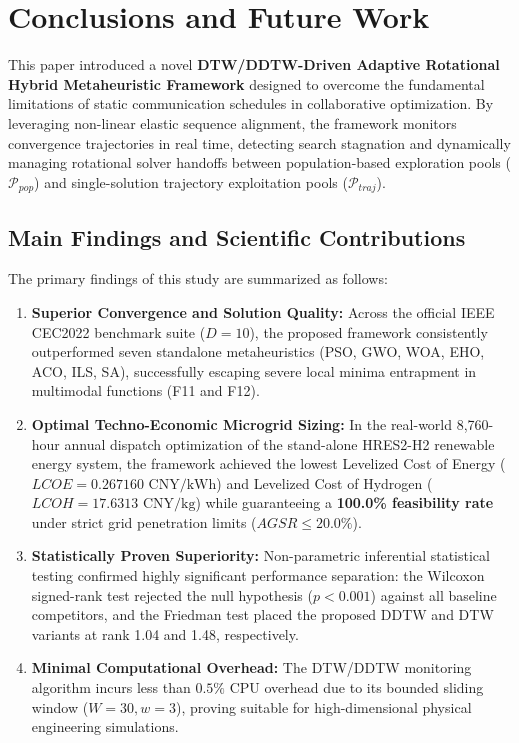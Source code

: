 \section{Conclusions and Future Work}
\label{sec:conclusions}

This paper introduced a novel \textbf{DTW/DDTW-Driven Adaptive Rotational Hybrid Metaheuristic Framework} designed to overcome the fundamental limitations of static communication schedules in collaborative optimization. By leveraging non-linear elastic sequence alignment, the framework monitors convergence trajectories in real time, detecting search stagnation and dynamically managing rotational solver handoffs between population-based exploration pools ($\mathcal{P}_{pop}$) and single-solution trajectory exploitation pools ($\mathcal{P}_{traj}$).

\subsection{Main Findings and Scientific Contributions}
\label{sec:conclusions_findings}

The primary findings of this study are summarized as follows:
\begin{enumerate}
    \item \textbf{Superior Convergence and Solution Quality:} Across the official IEEE CEC2022 benchmark suite ($D=10$), the proposed framework consistently outperformed seven standalone metaheuristics (PSO, GWO, WOA, EHO, ACO, ILS, SA), successfully escaping severe local minima entrapment in multimodal functions (F11 and F12).
    \item \textbf{Optimal Techno-Economic Microgrid Sizing:} In the real-world 8,760-hour annual dispatch optimization of the stand-alone HRES2-H2 renewable energy system, the framework achieved the lowest Levelized Cost of Energy ($LCOE = 0.267160 \text{ CNY/kWh}$) and Levelized Cost of Hydrogen ($LCOH = 17.6313 \text{ CNY/kg}$) while guaranteeing a \textbf{100.0\% feasibility rate} under strict grid penetration limits ($AGSR \le 20.0\%$).
    \item \textbf{Statistically Proven Superiority:} Non-parametric inferential statistical testing confirmed highly significant performance separation: the Wilcoxon signed-rank test rejected the null hypothesis ($p < 0.001$) against all baseline competitors, and the Friedman test placed the proposed DDTW and DTW variants at rank 1.04 and 1.48, respectively.
    \item \textbf{Minimal Computational Overhead:} The DTW/DDTW monitoring algorithm incurs less than $0.5\%$ CPU overhead due to its bounded sliding window ($W=30, w=3$), proving suitable for high-dimensional physical engineering simulations.
\end{enumerate}

